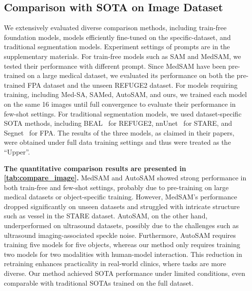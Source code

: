 \subsection{Comparison with SOTA on Image Dataset}
We extensively evaluated diverse comparison methods, including train-free foundation models, models efficiently fine-tuned on the specific-dataset, and traditional segmentation models. Experiment settings of prompts are in the supplementary materials. For train-free models such as SAM and MedSAM, we tested their performance with different prompt. Since MedSAM have been pre-trained on a large medical dataset, we evaluated its performance on both the pre-trained FPA dataset and the unseen REFUGE2 dataset. For models requiring training, including Med-SA, SAMed, AutoSAM, and ours, we trained each model on the same 16 images until full convergence to evaluate their performance in few-shot settings. For traditional segmentation models, we used dataset-specific SOTA methods, including BEAL~\cite{wang2019boundary} for REFUGE2, nnUnet~\cite{isensee2021nnu} for STARE, and Segnet~\cite{badrinarayanan2017segnet} for FPA. The results of the three models, as claimed in their papers, were obtained under full data training settings and thus were treated as the ``Upper''.

{\bf The quantitative comparison results are presented in \cref{tab:compare_image}.} MedSAM and AutoSAM showed strong performance in both train-free and few-shot settings, probably due to pre-training on large medical datasets or object-specific training. However, MedSAM's performance dropped significantly on unseen datasets and struggled with intricate structure such as vessel in the STARE dataset. AutoSAM, on the other hand, underperformed on ultrasound datasets, possibly due to the challenges such as ultrasound imaging-associated speckle noise. Furthermore, AutoSAM requires training five models for five objects, whereas our method only requires training two models for two modalities with human-model interaction. This reduction in retraining enhances practicality in real-world clinics, where tasks are more diverse. Our method achieved SOTA performance under limited conditions, even comparable with traditional SOTAs trained on the full dataset.

